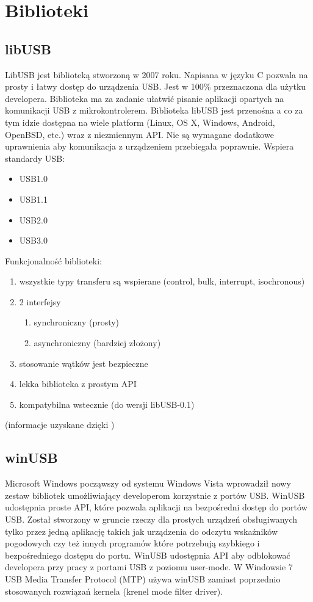 \documentclass{BscUS}
\begin{document}
\chapter{Biblioteki}
\label{librariesChapter}
\section{libUSB}
LibUSB jest biblioteką stworzoną w 2007 roku. Napisana w języku C  pozwala na prosty i łatwy dostęp do urządzenia USB. Jest w 100\% przeznaczona dla użytku developera. Biblioteka ma za zadanie ułatwić pisanie aplikacji opartych na komunikacji USB z mikrokontrolerem.
Biblioteka libUSB jest przenośna a co za tym idzie dostępna na wiele platform (Linux, OS X, Windows, Android, OpenBSD, etc.) wraz z niezmiennym API.
Nie są wymagane dodatkowe uprawnienia aby komunikacja z urządzeniem przebiegała poprawnie.
Wspiera standardy USB: 
\begin{itemize}
\item USB1.0 
\item USB1.1 
\item USB2.0 
\item USB3.0
\end{itemize}

Funkcjonalność biblioteki:
\begin{enumerate}

\item wszystkie typy transferu są wspierane (control, bulk, interrupt, isochronous)
\item 2 interfejsy
\begin{enumerate}
\item synchroniczny (prosty)
\item asynchroniczny (bardziej złożony)
\end{enumerate}
\item stosowanie wątków jest bezpieczne
\item lekka biblioteka z prostym API
\item kompatybilna wstecznie (do wersji libUSB-0.1)
\end{enumerate}
(informacje uzyskane dzięki \cite{libusbDesc})
\section{winUSB}

Microsoft Windows począwszy od systemu Windows Vista wprowadził nowy zestaw bibliotek umożliwiający developerom korzystnie z portów USB. WinUSB udostępnia proste API, które pozwala aplikacji na bezpośredni dostęp do portów USB. Został stworzony w gruncie rzeczy dla prostych urządzeń obsługiwanych tylko przez jedną aplikację takich jak urządzenia do odczytu wskaźników pogodowych czy też innych programów które potrzebują szybkiego i bezpośredniego dostępu do portu. WinUSB udostępnia API aby odblokować developera przy pracy z portami USB z poziomu user-mode. W Windowsie 7 USB Media Transfer Protocol (MTP) używa winUSB zamiast poprzednio stosowanych rozwiązań kernela (krenel mode filter driver).
\end{document}
